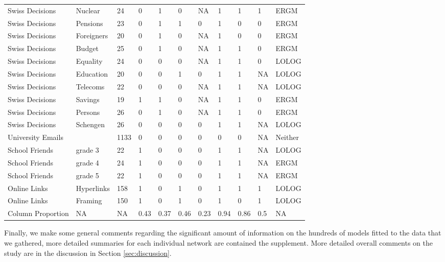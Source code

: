 \documentclass[
]{statsoc}
\begin{document}
\begin{table}
\begin{tabular}[t]{lllllllllll}
\addlinespace
\rowcolor{gray!6}  Swiss Decisions & Nuclear & 24 & 0 & 1 & 0 & NA & 1 & 1 & 1 & ERGM\\
Swiss Decisions & Pensions & 23 & 0 & 1 & 1 & 0 & 1 & 0 & 0 & ERGM\\
\rowcolor{gray!6}  Swiss Decisions & Foreigners & 20 & 0 & 1 & 0 & NA & 1 & 0 & 0 & ERGM\\
Swiss Decisions & Budget & 25 & 0 & 1 & 0 & NA & 1 & 1 & 0 & ERGM\\
\rowcolor{gray!6}  Swiss Decisions & Equality & 24 & 0 & 0 & 0 & NA & 1 & 1 & 0 & LOLOG\\
\addlinespace
Swiss Decisions & Education & 20 & 0 & 0 & 1 & 0 & 1 & 1 & NA & LOLOG\\
\rowcolor{gray!6}  Swiss Decisions & Telecoms & 22 & 0 & 0 & 0 & NA & 1 & 1 & NA & LOLOG\\
Swiss Decisions & Savings & 19 & 1 & 1 & 0 & NA & 1 & 1 & 0 & ERGM\\
\rowcolor{gray!6}  Swiss Decisions & Persons & 26 & 0 & 1 & 0 & NA & 1 & 1 & 0 & ERGM\\
Swiss Decisions & Schengen & 26 & 0 & 0 & 0 & 0 & 1 & 1 & NA & LOLOG\\
\addlinespace
\rowcolor{gray!6}  University Emails &  & 1133 & 0 & 0 & 0 & 0 & 0 & 0 & NA & Neither\\
School Friends & grade 3 & 22 & 1 & 0 & 0 & 0 & 1 & 1 & NA & LOLOG\\
\rowcolor{gray!6}  School Friends & grade 4 & 24 & 1 & 0 & 0 & 0 & 1 & 1 & NA & ERGM\\
School Friends & grade 5 & 22 & 1 & 0 & 0 & 0 & 1 & 1 & NA & ERGM\\
\rowcolor{gray!6}  Online Links & Hyperlinks & 158 & 1 & 0 & 1 & 0 & 1 & 1 & 1 & LOLOG\\
\addlinespace
Online Links & Framing & 150 & 1 & 0 & 1 & 0 & 1 & 0 & 1 & LOLOG\\
\hline
\hline
\rowcolor{gray!6}  Column Proportion & NA & NA & 0.43 & 0.37 & 0.46 & 0.23 & 0.94 & 0.86 & 0.5 & NA\\
\bottomrule
\end{tabular}
\end{table}

Finally, we make some general comments regarding the significant amount
of information on the hundreds of models fitted to the data that we
gathered, more detailed summaries for each individual network are
contained the supplement. More detailed overall comments on the study
are in the discussion in Section \ref{sec:discussion}.
\end{document}
